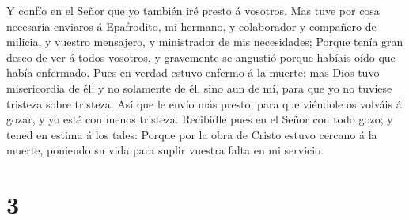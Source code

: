  Y confío en el Señor que yo también iré presto á vosotros.
 Mas tuve por cosa necesaria enviaros á Epafrodito, mi
hermano, y colaborador y compañero de milicia, y vuestro mensajero, y
ministrador de mis necesidades;  Porque tenía gran deseo de
ver á todos vosotros, y gravemente se angustió porque habíais oído que
había enfermado.  Pues en verdad estuvo enfermo á la
muerte: mas Dios tuvo misericordia de él; y no solamente de él, sino aun
de mí, para que yo no tuviese tristeza sobre tristeza.  Así
que le envío más presto, para que viéndole os volváis á gozar, y yo esté
con menos tristeza.  Recibidle pues en el Señor con todo
gozo; y tened en estima á los tales:  Porque por la obra de
Cristo estuvo cercano á la muerte, poniendo su vida para suplir vuestra
falta en mi servicio.

\hypertarget{section-2}{%
\section{3}\label{section-2}}

